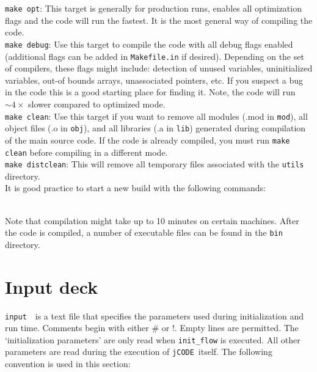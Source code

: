 \documentclass[12pt]{article}
\newcommand{\code}[1]{\texttt{#1}}
\newcommand{\jcode}{\code{jCODE}~}
\newcommand{\inp}{\code{input}~}
\begin{document}
\noindent \code{make opt}: This target is generally for production runs, enables all optimization flags and the code will run the fastest. It is the most general way of compiling the code. \\

\noindent \code{make debug}: Use this target to compile the code with all debug flags enabled (additional flags can be added in \code{Makefile.in} if desired). Depending on the set of compilers, these flags might include: detection of unused variables, uninitialized variables, out-of bounds arrays, unassociated pointers, etc. If you suspect a bug in the code this is a good starting place for finding it. Note, the code will run $\sim4\times$ slower compared to optimized mode. \\

\noindent \code{make clean}:
Use this target if you want to remove all modules (.mod in \code{mod}), all object files (.o in \code{obj}), and all libraries (.a in \code{lib}) generated during compilation of the main source code. If the code is already compiled, you must run \code{make clean} before compiling in a different mode. \\

\noindent \code{make distclean}:
This will remove all temporary files associated with the \code{utils} directory. \\

\noindent It is good practice to start a new build with the following commands: 

\vspace{1em}
\vspace{1em} \\
Note that compilation might take up to 10 minutes on certain machines. After the code is compiled, a number of executable files can be found in the \code{bin} directory.

\section{Input deck}\label{sec:input_deck}
\inp\ is a text file that specifies the parameters used during initialization and run time.  Comments begin with either \# or !.  Empty lines are permitted. The `initialization parameters' are only read when \code{init\_flow} is executed. All other parameters are read during the execution of \jcode itself. The following convention is used in this section:
\end{document}
